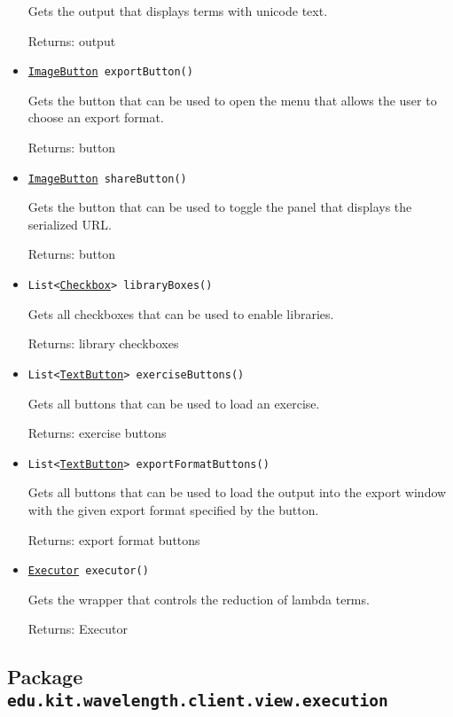 \begin{itemize}
Gets the output that displays terms with unicode text.

Returns: output

\item \texttt{\hyperref[type:edu.kit.wavelength.client.view.webui.component.ImageButton]{ImageButton} exportButton()}

Gets the button that can be used to open the menu that allows the user to choose an export format.

Returns: button

\item \texttt{\hyperref[type:edu.kit.wavelength.client.view.webui.component.ImageButton]{ImageButton} shareButton()}

Gets the button that can be used to toggle the panel that displays the serialized URL.

Returns: button

\item \texttt{List<\hyperref[type:edu.kit.wavelength.client.view.webui.component.Checkbox]{Checkbox}> libraryBoxes()}

Gets all checkboxes that can be used to enable libraries.

Returns: library checkboxes

\item \texttt{List<\hyperref[type:edu.kit.wavelength.client.view.webui.component.TextButton]{TextButton}> exerciseButtons()}

Gets all buttons that can be used to load an exercise.

Returns: exercise buttons

\item \texttt{List<\hyperref[type:edu.kit.wavelength.client.view.webui.component.TextButton]{TextButton}> exportFormatButtons()}

Gets all buttons that can be used to load the output into the export window with the given export format specified by the button.

Returns: export format buttons

\item \texttt{\hyperref[type:edu.kit.wavelength.client.view.execution.Executor]{Executor} executor()}

Gets the wrapper that controls the reduction of lambda terms.

Returns: Executor

\end{itemize}

\subsection{Package \lstinline{edu.kit.wavelength.client.view.execution}}
\label{pkg:edu.kit.wavelength.client.view.execution}


